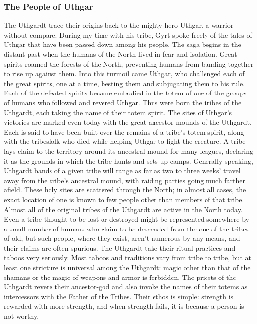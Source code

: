 \documentclass[10pt,a4paper,twoside,twocolumn,openany,bg=print,nodeprecatedcode]{dndbook}
\begin{document}
\subsubsection{The People of Uthgar}
The Uthgardt trace their origins back to the mighty hero Uthgar, a warrior without compare. During my time with his tribe, Gyrt spoke freely of the tales of Uthgar that have been passed down among his people. The saga begins in the distant past when the humans of the North lived in fear and isolation. Great spirits roamed the forests of the North, preventing humans from banding together to rise up against them. Into this turmoil came Uthgar, who challenged each of the great spirits, one at a time, besting them and subjugating them to his rule. Each of the defeated spirits became embodied in the totem of one of the groups of humans who followed and revered Uthgar. Thus were born the tribes of the Uthgardt, each taking the name of their totem spirit.
The sites of Uthgar's victories are marked even today with the great ancestor-mounds of the Uthgardt. Each is said to have been built over the remains of a tribe's totem spirit, along with the tribesfolk who died while helping Uthgar to fight the creature.
A tribe lays claim to the territory around its ancestral mound for many leagues, declaring it as the grounds in which the tribe hunts and sets up camps. Generally speaking, Uthgardt bands of a given tribe will range as far as two to three weeks' travel away from the tribe's ancestral mound, with raiding parties going much farther afield. These holy sites are scattered through the North; in almost all cases, the exact location of one is known to few people other than members of that tribe.
Almost all of the original tribes of the Uthgardt are active in the North today. Even a tribe thought to be lost or destroyed might be represented somewhere by a small number of humans who claim to be descended from the one of the tribes of old, but such people, where they exist, aren't numerous by any means, and their claims are often spurious.
The Uthgardt take their ritual practices and taboos very seriously. Most taboos and traditions vary from tribe to tribe, but at least one stricture is universal among the Uthgardt: magic other than that of the shamans or the magic of weapons and armor is forbidden.
The priests of the Uthgardt revere their ancestor-god and also invoke the names of their totems as intercessors with the Father of the Tribes. Their ethos is simple: strength is rewarded with more strength, and when strength fails, it is because a person is not worthy.
\end{document}
